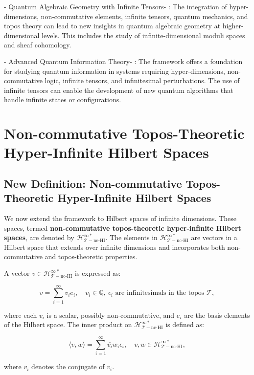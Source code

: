 \documentclass{article}
\begin{document}
-  Quantum Algebraic Geometry with Infinite Tensors- : The integration of hyper-dimensions, non-commutative elements, infinite tensors, quantum mechanics, and topos theory can lead to new insights in quantum algebraic geometry at higher-dimensional levels. This includes the study of infinite-dimensional moduli spaces and sheaf cohomology.

-  Advanced Quantum Information Theory- : The framework offers a foundation for studying quantum information in systems requiring hyper-dimensions, non-commutative logic, infinite tensors, and infinitesimal perturbations. The use of infinite tensors can enable the development of new quantum algorithms that handle infinite states or configurations.


\section{Non-commutative Topos-Theoretic Hyper-Infinite Hilbert Spaces}
\subsection{New Definition: Non-commutative Topos-Theoretic Hyper-Infinite Hilbert Spaces}
We now extend the framework to Hilbert spaces of infinite dimensions. These spaces, termed \textbf{non-commutative topos-theoretic hyper-infinite Hilbert spaces}, are denoted by \(\mathcal{H}_{\mathcal{T}-\text{nc-HI}}^{\infty *}\). The elements in \(\mathcal{H}_{\mathcal{T}-\text{nc-HI}}^{\infty *}\) are vectors in a Hilbert space that extends over infinite dimensions and incorporates both non-commutative and topos-theoretic properties.

A vector \(v \in \mathcal{H}_{\mathcal{T}-\text{nc-HI}}^{\infty *}\) is expressed as:

\[
v = \sum_{i=1}^{\infty} v_i e_i, \quad v_i \in \mathbb{Q}, \ \epsilon_i \text{ are infinitesimals in the topos } \mathcal{T}, 
\]

where each \(v_i\) is a scalar, possibly non-commutative, and \(e_i\) are the basis elements of the Hilbert space. The inner product on \(\mathcal{H}_{\mathcal{T}-\text{nc-HI}}^{\infty *}\) is defined as:

\[
\langle v, w \rangle = \sum_{i=1}^{\infty} \overline{v_i} w_i \epsilon_i, \quad v, w \in \mathcal{H}_{\mathcal{T}-\text{nc-HI}}^{\infty *},
\]

where \(\overline{v_i}\) denotes the conjugate of \(v_i\).
\end{document}
